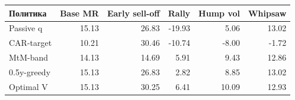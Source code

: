 \begin{tabular}{lrrrrr}
\toprule
Политика & Base MR & Early sell-off & Rally & Hump vol & Whipsaw \\
\midrule
Passive q & 15.13 & 26.83 & -19.93 & 5.06 & 13.02 \\
CAR-target & 10.21 & 30.46 & -10.74 & -8.00 & -1.72 \\
MtM-band & 14.13 & 14.69 & 5.91 & 9.43 & 12.86 \\
0.5y-greedy & 15.13 & 26.83 & 2.82 & 8.85 & 13.02 \\
Optimal V & 15.13 & 30.25 & 6.41 & 10.09 & 12.93 \\
\bottomrule
\end{tabular}
